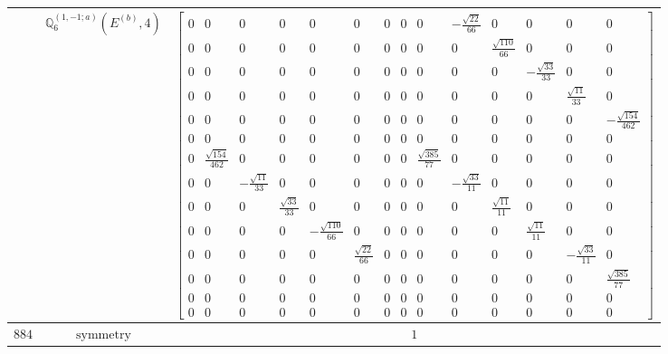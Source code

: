 \documentclass[fleqn,8pt,landscape]{jsarticle}
\begin{document}
\begin{longtable}{ccc}
$  $ & $ \mathbb{Q}_{6}^{(1,-1;a)}(E^{(b)},4) $ & $ \begin{bmatrix} 0 & 0 & 0 & 0 & 0 & 0 & 0 & 0 & 0 & - \frac{\sqrt{22}}{66} & 0 & 0 & 0 & 0 \\ 0 & 0 & 0 & 0 & 0 & 0 & 0 & 0 & 0 & 0 & \frac{\sqrt{110}}{66} & 0 & 0 & 0 \\ 0 & 0 & 0 & 0 & 0 & 0 & 0 & 0 & 0 & 0 & 0 & - \frac{\sqrt{33}}{33} & 0 & 0 \\ 0 & 0 & 0 & 0 & 0 & 0 & 0 & 0 & 0 & 0 & 0 & 0 & \frac{\sqrt{11}}{33} & 0 \\ 0 & 0 & 0 & 0 & 0 & 0 & 0 & 0 & 0 & 0 & 0 & 0 & 0 & - \frac{\sqrt{154}}{462} \\ 0 & 0 & 0 & 0 & 0 & 0 & 0 & 0 & 0 & 0 & 0 & 0 & 0 & 0 \\ 0 & \frac{\sqrt{154}}{462} & 0 & 0 & 0 & 0 & 0 & 0 & \frac{\sqrt{385}}{77} & 0 & 0 & 0 & 0 & 0 \\ 0 & 0 & - \frac{\sqrt{11}}{33} & 0 & 0 & 0 & 0 & 0 & 0 & - \frac{\sqrt{33}}{11} & 0 & 0 & 0 & 0 \\ 0 & 0 & 0 & \frac{\sqrt{33}}{33} & 0 & 0 & 0 & 0 & 0 & 0 & \frac{\sqrt{11}}{11} & 0 & 0 & 0 \\ 0 & 0 & 0 & 0 & - \frac{\sqrt{110}}{66} & 0 & 0 & 0 & 0 & 0 & 0 & \frac{\sqrt{11}}{11} & 0 & 0 \\ 0 & 0 & 0 & 0 & 0 & \frac{\sqrt{22}}{66} & 0 & 0 & 0 & 0 & 0 & 0 & - \frac{\sqrt{33}}{11} & 0 \\ 0 & 0 & 0 & 0 & 0 & 0 & 0 & 0 & 0 & 0 & 0 & 0 & 0 & \frac{\sqrt{385}}{77} \\ 0 & 0 & 0 & 0 & 0 & 0 & 0 & 0 & 0 & 0 & 0 & 0 & 0 & 0 \\ 0 & 0 & 0 & 0 & 0 & 0 & 0 & 0 & 0 & 0 & 0 & 0 & 0 & 0 \end{bmatrix} $ \\ \hline
$ 884 $ & $ \text{symmetry} $ & $ 1 $ \\

\end{longtable}
\end{document}
